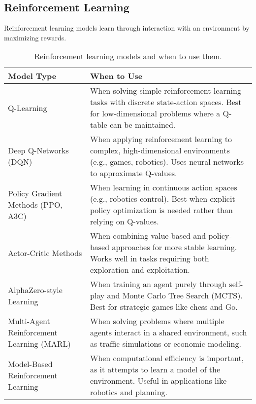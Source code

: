 \documentclass[12pt,openany]{book}
\begin{document}
\subsection{Reinforcement Learning}

Reinforcement learning models learn through interaction with an environment 
by maximizing rewards.

\begin{table}[H]
    \centering
    \small
    \renewcommand{\arraystretch}{1.3} %
    \begin{tabular}{|l|p{8cm}|}
        \hline
        \textbf{Model Type} & \textbf{When to Use} \\
        \hline
        Q-Learning & When solving simple reinforcement learning tasks with discrete state-action spaces. Best for low-dimensional problems where a Q-table can be maintained. \\
        \hline
        Deep Q-Networks (DQN) & When applying reinforcement learning to complex, high-dimensional environments (e.g., games, robotics). Uses neural networks to approximate Q-values. \\
        \hline
        Policy Gradient Methods (PPO, A3C) & When learning in continuous action spaces (e.g., robotics control). Best when explicit policy optimization is needed rather than relying on Q-values. \\
        \hline
        Actor-Critic Methods & When combining value-based and policy-based approaches for more stable learning. Works well in tasks requiring both exploration and exploitation. \\
        \hline
        AlphaZero-style Learning & When training an agent purely through self-play and Monte Carlo Tree Search (MCTS). Best for strategic games like chess and Go. \\
        \hline
        Multi-Agent Reinforcement Learning (MARL) & When solving problems where multiple agents interact in a shared environment, such as traffic simulations or economic modeling. \\
        \hline
        Model-Based Reinforcement Learning & When computational efficiency is important, as it attempts to learn a model of the environment. Useful in applications like robotics and planning. \\
        \hline
    \end{tabular}
    \caption{Reinforcement learning models and when to use them.}
\end{table}
\end{document}

